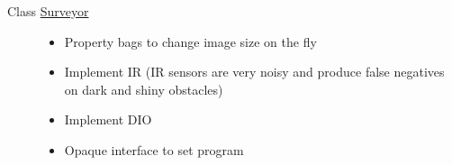 \label{todo__todo000001}
\hypertarget{todo__todo000001}{}
 \begin{description}
\item[Class \hyperlink{classSurveyor}{Surveyor} ]\begin{itemize}
\item Property bags to change image size on the fly\item Implement IR (IR sensors are very noisy and produce false negatives on dark and shiny obstacles)\item Implement DIO\item Opaque interface to set program\end{itemize}


\end{description}
